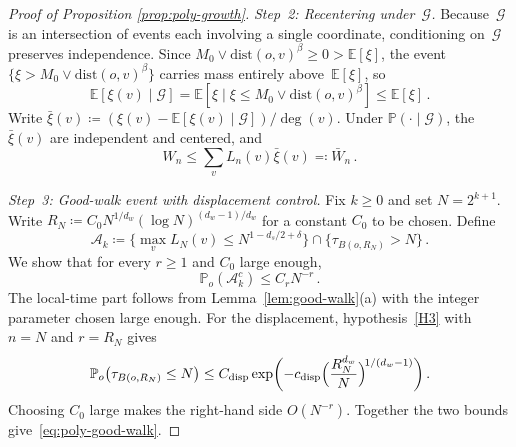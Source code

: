 \documentclass[11pt]{amsart}
\theoremstyle{plain}
\theoremstyle{definition}
\newcommand{\E}{\mathbb{E}}
\renewcommand{\P}{\mathbb{P}}
\begin{document}
\begin{proof}[Proof of Proposition \ref{prop:poly-growth}]
		\emph{Step~2: Recentering under~$\mathcal{G}$.}
		Because~$\mathcal{G}$ is an intersection of events each involving a single coordinate, conditioning on~$\mathcal{G}$ preserves independence.  Since $M_0\vee \mathrm{dist}(o,v)^\beta\geq 0>\E[\xi]$, the event $\{\xi>M_0\vee \mathrm{dist}(o,v)^\beta\}$ carries mass entirely above~$\E[\xi]$, so
		\[
		\E[\xi(v)\mid\mathcal{G}] = \E[\xi\mid\xi\leq M_0\vee \mathrm{dist}(o,v)^\beta] \leq \E[\xi]\,.
		\]
		Write $\bar\xi(v)\coloneqq(\xi(v)-\E[\xi(v)\mid\mathcal{G}])/\deg(v)$.  Under $\P(\cdot\mid\mathcal{G})$, the $\bar\xi(v)$ are independent and centered, and
		\begin{equation}\label{eq:poly-Wbar}
			W_n \leq \sum_v L_n(v)\bar\xi(v) \eqqcolon \bar W_n\,.
		\end{equation}
		
		\emph{Step~3: Good-walk event with displacement control.}
		Fix $k\geq 0$ and set $N=2^{k+1}$. Write $R_N\coloneqq C_0 N^{1/d_w}(\log N)^{(d_w-1)/d_w}$ for a constant $C_0$ to be chosen. Define
		\[
		\mathcal{A}_k \coloneqq \bigl\{\max_v L_N(v)\leq N^{1-d_s/2+\delta}\bigr\}
		\cap \bigl\{\tau_{B(o,R_N)}> N\bigr\}\,.
		\]
		We show that for every $r\geq 1$ and $C_0$ large enough,
		\begin{equation}\label{eq:poly-good-walk}
			\P_o(\mathcal{A}_k^c) \leq C_r N^{-r}\,.
		\end{equation}
		The local-time part follows from Lemma~\ref{lem:good-walk}(a) with the integer parameter chosen large enough. For the displacement, hypothesis~\ref{H3} with $n=N$ and $r=R_N$ gives
		\[
		\P_o\bigl(\tau_{B(o,R_N)}\leq N\bigr)\leq C_{\mathrm{disp}}\exp\biggl(-c_{\mathrm{disp}}\Bigl(\frac{R_N^{d_w}}{N}\Bigr)^{\!1/(d_w-1)}\biggr)\,.
		\]
		Choosing $C_0$ large makes the right-hand side $O(N^{-r})$.  Together the two bounds give~\eqref{eq:poly-good-walk}.
		

\end{proof}
\end{document}
